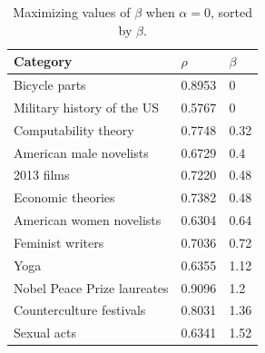 \begin{table}
\begin{tabular}{lll}
\toprule
Category &  $\rho$ &  $\beta$ \\
\midrule
           Bicycle parts &  0.8953 &     0 \\
 Military history of the US &  0.5767 &     0 \\
                  Computability theory &  0.7748 &  0.32 \\
               American male novelists &  0.6729 &   0.4 \\
                            2013 films &  0.7220 &  0.48 \\
                     Economic theories &  0.7382 &  0.48 \\
              American women novelists &  0.6304 &  0.64 \\
                      Feminist writers &  0.7036 &  0.72 \\
                                  Yoga &  0.6355 &  1.12 \\
           Nobel Peace Prize laureates &  0.9096 &   1.2 \\
              Counterculture festivals &  0.8031 &  1.36 \\
                           Sexual acts &  0.6341 &  1.52 \\
\bottomrule
\end{tabular}
\caption{Maximizing values of $\beta$ when $\alpha = 0$, sorted by $\beta$.}
\label{tab:maxbeta}
\end{table}



